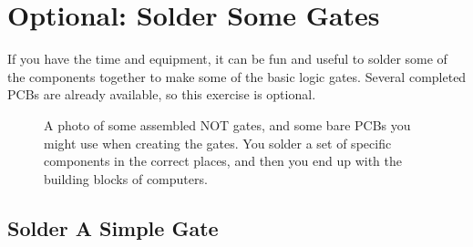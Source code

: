 \section{Optional: Solder Some Gates}

If you have the time and equipment, it can be fun and useful to solder some of the components together to make some of the basic logic gates. Several completed PCBs are already available, so this exercise is optional. 


\begin{figure}[ht!]
\begin{center}
\end{center}
\caption{A photo of some assembled NOT gates, and some bare PCBs you might use when creating the gates. You solder a set of specific components in the correct places, and then you end up with the building blocks of computers.}
\label{fig:barepcbs}
\end{figure}

\subsection*{Solder A Simple Gate}

\bi

